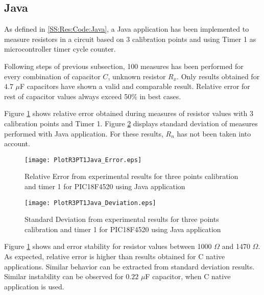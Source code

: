 \subsection{Java}\label{S:Res:Results:Java}
As defined in \ref{SS:Res:Code:Java}, a Java application has been implemented to measure resistors in a circuit based on 3 calibration points and using Timer 1 as microcontroller timer cycle counter.

Following steps of previous subsection, 100 measures has been performed for every combination of capacitor $C$, unknown resistor $R_{x}$. Only results obtained for $4.7$ $\mu$F capacitors have shown a valid and comparable result. Relative error for rest of capacitor values always exceed 50\% in best cases.

Figure \ref{fig:PlotR3PT1ErrorJava} shows relative error obtained during measures of  resistor values with 3 calibration points and Timer 1. Figure \ref{fig:PlotR3PT1DeviationJava} displays standard deviation of measures performed with Java application. For these results, $R_{n}$ has not been taken into account.

\begin{figure}[H]
\centering
\texttt{[image: PlotR3PT1Java\_Error.eps]}
\caption{Relative Error from experimental results for three points calibration and timer 1 for PIC18F4520 using Java application}
\label{fig:PlotR3PT1ErrorJava}
\end{figure}

\begin{figure}[H]
\centering
\texttt{[image: PlotR3PT1Java\_Deviation.eps]}
\caption{Standard Deviation from experimental results for three points calibration and timer 1 for PIC18F4520 using Java application}
\label{fig:PlotR3PT1DeviationJava}
\end{figure}

Figure \ref{fig:PlotR3PT1ErrorJava} shows and error stability for resistor values between 1000 $\Omega$ and 1470 $\Omega$. As expected, relative error is higher than results obtained for C native applications. Similar behavior can be extracted from standard deviation results. Similar instability can be observed for $0.22$ $\mu$F capacitor, when C native application is used.